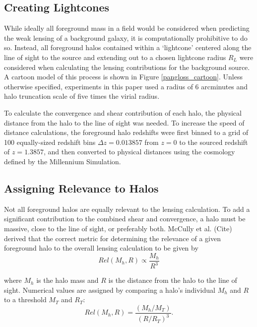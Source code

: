 \documentclass[%
 reprint,
 amsmath,amssymb,
 aps,nofootinbib
]{revtex4-1}
\begin{document}
\subsection{Creating Lightcones}

While ideally all foreground mass in a field would be considered when predicting the weak lensing of a background galaxy, it is computationally prohibitive to do so. Instead, all foreground halos contained within a `lightcone' centered along the line of sight to the source and extending out to a chosen lightcone radius $R_L$ were considered when calculating the lensing contributions for the background source. A cartoon model of this process is shown in Figure \ref{pangloss_cartoon}. Unless otherwise specified, experiments in this paper used a radius of 6 arcminutes and halo truncation scale of five times the virial radius.

To calculate the convergence and shear contribution of each halo, the physical distance from the halo to the line of sight was needed. To increase the speed of distance calculations, the foreground halo redshifts were first binned to a grid of 100 equally-sized redshift bins $\Delta z=0.013857$ from $z=0$ to the sourced redshift of $z=1.3857$, and then converted to physical distances using the cosmology defined by the Millennium Simulation.

\subsection{Assigning Relevance to Halos}

Not all foreground halos are equally relevant to the lensing calculation. To add a significant contribution to the combined shear and convergence, a halo must be massive, close to the line of sight, or preferably both. McCully et al. (Cite) derived that the correct metric for determining the relevance of a given foreground halo to the overall lensing calculation to be given by
\begin{equation}\label{relevant}
Rel(M_h,R)\propto\frac{M_h}{R^3}
\end{equation}

\noindent where $M_h$ is the halo mass and $R$ is the distance from the halo to the line of sight. Numerical values are assigned by comparing a halo's individual $M_h$ and $R$ to a threshold $M_T$ and $R_T$:
\begin{equation}\label{relevant_thresh}
Rel(M_h,R)=\frac{(M_h/M_T)}{(R/R_T)^3}.
\end{equation}
\end{document}
